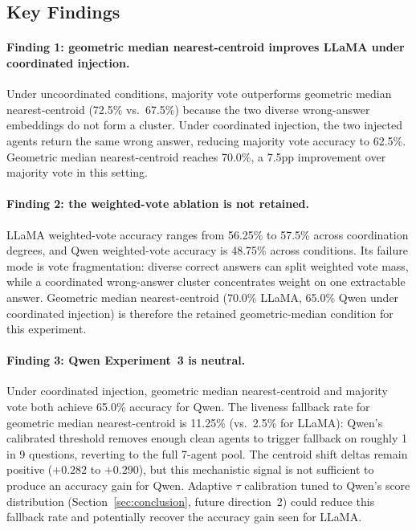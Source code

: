\documentclass[11pt]{article}
\begin{document}
\subsection{Key Findings}
\label{sec:exp3-findings}

\paragraph{Finding 1: geometric median nearest-centroid improves LLaMA under
coordinated injection.}
Under uncoordinated conditions, majority vote outperforms geometric median
nearest-centroid (72.5\% vs.\ 67.5\%) because the two diverse wrong-answer
embeddings do not form a cluster. Under coordinated injection, the two injected
agents return the same wrong answer, reducing majority vote accuracy to 62.5\%.
Geometric median nearest-centroid reaches 70.0\%, a 7.5pp improvement over
majority vote in this setting.

\paragraph{Finding 2: the weighted-vote ablation is not retained.}
LLaMA weighted-vote accuracy ranges from 56.25\% to 57.5\% across coordination
degrees, and Qwen weighted-vote accuracy is 48.75\% across conditions. Its
failure mode is vote fragmentation: diverse correct answers can split weighted
vote mass, while a coordinated wrong-answer cluster concentrates weight on one
extractable answer. Geometric median nearest-centroid (70.0\% LLaMA, 65.0\%
Qwen under coordinated injection) is therefore the retained geometric-median
condition for this experiment.

\paragraph{Finding 3: Qwen Experiment~3 is neutral.}
Under coordinated injection, geometric median nearest-centroid and majority vote
both achieve 65.0\% accuracy for Qwen. The liveness fallback rate for geometric
median nearest-centroid is 11.25\% (vs.\ 2.5\% for LLaMA): Qwen's calibrated
threshold removes enough clean agents to trigger fallback on roughly 1 in 9
questions, reverting to the full 7-agent pool. The centroid shift deltas
remain positive ($+0.282$ to $+0.290$), but this mechanistic signal is not
sufficient to produce an accuracy gain for Qwen. Adaptive $\tau$ calibration
tuned to Qwen's score distribution (Section~\ref{sec:conclusion}, future
direction~2) could reduce this fallback rate and potentially recover the accuracy
gain seen for LLaMA.
\end{document}
